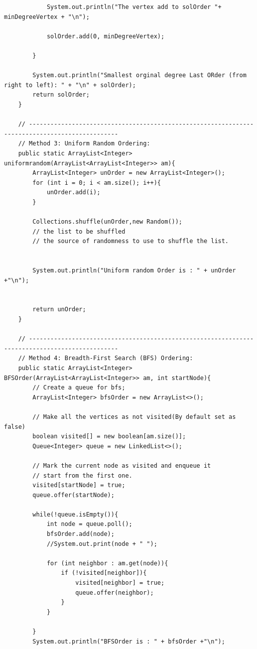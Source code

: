 \documentclass{article}
\begin{document}
\begin{verbatim}
            System.out.println("The vertex add to solOrder "+ minDegreeVertex + "\n");

            solOrder.add(0, minDegreeVertex);

        }

        System.out.println("Smallest orginal degree Last ORder (from right to left): " + "\n" + solOrder);
        return solOrder;
    }

    // -----------------------------------------------------------------------------------------------
    // Method 3: Uniform Random Ordering:
    public static ArrayList<Integer> uniformrandom(ArrayList<ArrayList<Integer>> am){
        ArrayList<Integer> unOrder = new ArrayList<Integer>();
        for (int i = 0; i < am.size(); i++){
            unOrder.add(i);
        }

        Collections.shuffle(unOrder,new Random());
        // the list to be shuffled
        // the source of randomness to use to shuffle the list.


        System.out.println("Uniform random Order is : " + unOrder +"\n");


        return unOrder;
    }

    // -----------------------------------------------------------------------------------------------
    // Method 4: Breadth-First Search (BFS) Ordering:
    public static ArrayList<Integer> BFSOrder(ArrayList<ArrayList<Integer>> am, int startNode){
        // Create a queue for bfs;
        ArrayList<Integer> bfsOrder = new ArrayList<>();

        // Make all the vertices as not visited(By default set as false)
        boolean visited[] = new boolean[am.size()];
        Queue<Integer> queue = new LinkedList<>();

        // Mark the current node as visited and enqueue it
        // start from the first one.
        visited[startNode] = true;
        queue.offer(startNode);

        while(!queue.isEmpty()){
            int node = queue.poll();
            bfsOrder.add(node);
            //System.out.print(node + " ");

            for (int neighbor : am.get(node)){
                if (!visited[neighbor]){
                    visited[neighbor] = true;
                    queue.offer(neighbor);
                }
            }

        }
        System.out.println("BFSOrder is : " + bfsOrder +"\n");


\end{verbatim}
\end{document}
